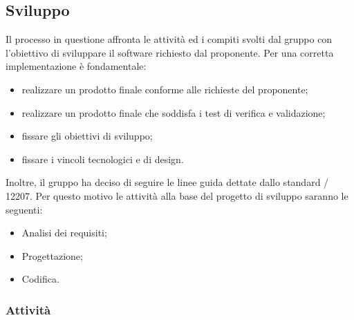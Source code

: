 \subsection{Sviluppo}
Il processo in questione affronta le attività ed i compiti svolti dal gruppo con l'obiettivo di sviluppare il software richiesto dal proponente. Per una corretta implementazione è fondamentale:
\begin{itemize}
		\item realizzare un prodotto finale conforme alle richieste del proponente;
		\item realizzare un prodotto finale che soddisfa i test di verifica e validazione;
		\item fissare gli obiettivi di sviluppo;
		\item fissare i vincoli tecnologici e di design.
\end{itemize}
Inoltre, il gruppo ha deciso di seguire le linee guida dettate dallo standard / 12207. Per questo motivo le attività alla base del progetto di sviluppo saranno le seguenti:
\begin{itemize}
	\item Analisi dei requisiti;
	\item Progettazione;
	\item Codifica.
\end{itemize}
\subsubsection{Attività}

